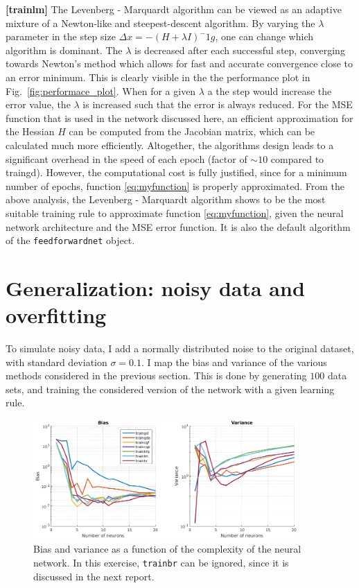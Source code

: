 \documentclass[10pt,a4paper]{article}
\begin{document}
\textbf{[trainlm]} The Levenberg - Marquardt algorithm can be viewed as an adaptive mixture of a Newton-like and steepest-descent algorithm. By varying the $\lambda$ parameter in the step size $\Delta x = - (H + \lambda I)^-1 g$, one can change which algorithm is dominant. The $\lambda$ is decreased after each successful step, converging towards Newton's method which allows for fast and accurate convergence close to an error minimum. This is clearly visible in the the performance plot in Fig.~\ref{fig:performace_plot}. When for a given $\lambda$ a the step would increase the error value, the $\lambda$ is increased such that the error is always reduced. For the MSE function that is used in the network discussed here, an efficient approximation for the Hessian $H$ can be computed from the Jacobian matrix, which can be calculated much more efficiently. Altogether, the algorithms design leads to a significant overhead in the speed of each epoch (factor of $\sim 10$ compared to traingd). However, the computational cost is fully justified, since for a minimum number of epochs, function \eqref{eq:myfunction} is properly approximated.
From the above analysis, the Levenberg - Marquardt algorithm shows to be the most suitable training rule to approximate function \eqref{eq:myfunction}, given the neural network architecture and the MSE error function. It is also the default algorithm of the \texttt{feedforwardnet} object.

\section{Generalization: noisy data and overfitting}
To simulate noisy data, I add a normally distributed noise to the original dataset, with standard deviation $\sigma = 0.1$. I map the bias and variance of the various methods considered in the previous section. This is done by generating $100$ data sets, and training the considered version of the network with a given learning rule. 
\begin{figure}[hbt]
\centering
\includegraphics[width=0.9\textwidth]{figs/bias_and_variance.png}
\caption{Bias and variance as a function of the complexity of the neural network. In this exercise, \texttt{trainbr} can be ignored, since it is discussed in the next report.\label{fig:bias_and_variance}}
\end{figure}
\end{document}
